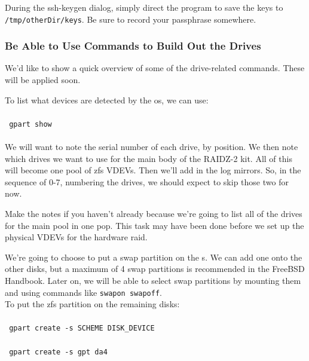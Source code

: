 During the ssh-keygen   \gls{dialog}, simply direct the prog\gls{ram} to save the keys to \texttt{/tmp/otherDir/keys}.  Be sure to record your \gls{passphrase} somewhere.

\subsubsection{Be Able to Use Commands to Build Out the Drives}
We'd like to show a quick overview of some of the drive-related commands.  These will be applied soon.

To list what devices are detected by the \gls{os}, we can use:\\\\
\texttt{ gpart show}\\\\
We will want to note the serial number of each drive, by position.
We then note which drives we want to use for the main body of the RAIDZ-2 kit.  All of this will become one pool of \gls{zfs} VDEVs.  Then we'll add in the log \gls{mirror}s.  So, in the sequence of 0-7, numbering the drives, we should expect to skip those two for now.

Make the notes if you haven't already because we're going to list all of the drives for the main pool in one pop.  This task may have been done before we set up the physical VDEVs for the hardware  \gls{raid}.

We're going to choose to put a swap \gls{partition} on the s.  We can add one onto the other disks, but a maximum of 4 swap partitions is recommended in the FreeBSD Handbook.  Later on, we will be able to select swap partitions by mounting them and using commands like \texttt{swapon swapoff}.\\

To put the \gls{zfs} \gls{partition} on the remaining disks:\\\\
\texttt{ gpart create -s SCHEME DISK\_DEVICE}\\\\
\texttt{ gpart create -s gpt da4}
\\

